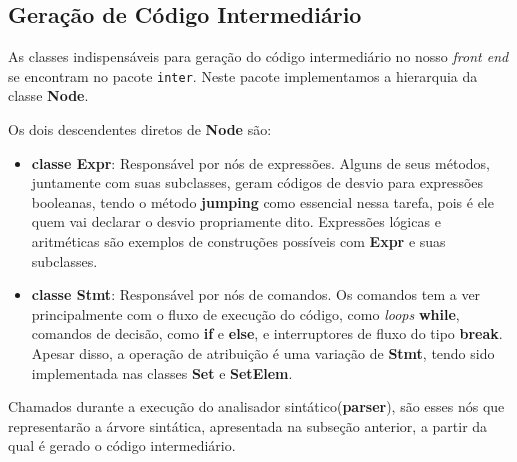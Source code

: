 \subsection{Geração de Código Intermediário}

As classes indispensáveis para geração do código intermediário no nosso \textit{front end} se encontram no pacote \texttt{inter}. Neste pacote implementamos a hierarquia da classe \textbf{Node}.

Os dois descendentes diretos de \textbf{Node} são:
\begin{itemize}
	\item \textbf{classe Expr}: Responsável por nós de expressões. Alguns de seus métodos, juntamente com suas subclasses, geram códigos de desvio para expressões booleanas, tendo o método \textbf{jumping} como essencial nessa tarefa, pois é ele quem vai declarar o desvio propriamente dito. Expressões lógicas e aritméticas são exemplos de construções possíveis com \textbf{Expr} e suas subclasses.
    \item \textbf{classe Stmt}: Responsável por nós de comandos. Os comandos tem a ver principalmente com o fluxo de execução do código, como \textit{loops} \textbf{while}, comandos de decisão, como \textbf{if} e \textbf{else}, e interruptores de fluxo do tipo \textbf{break}. Apesar disso, a operação de atribuição é uma variação de \textbf{Stmt}, tendo sido implementada nas classes \textbf{Set} e \textbf{SetElem}.
\end{itemize}

Chamados durante a execução do analisador sintático(\textbf{parser}), são esses nós que representarão a árvore sintática, apresentada na subseção anterior, a partir da qual é gerado o código intermediário.
